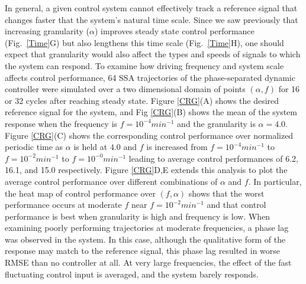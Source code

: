 \documentclass[12pt]{iopart}
\begin{document}
In general, a given control system cannot effectively track a reference signal that changes faster that the system's natural time scale. Since we saw previously that increasing granularity ($\alpha$) improves steady state control performance (Fig.\ \ref{Time}G) but also lengthens this time scale (Fig.\ \ref{Time}H), one should expect that granularity would also affect the types and speeds of signals to which the system can respond.
To examine how driving frequency and system scale affects control performance, 64 SSA trajectories of the phase-separated dynamic controller were simulated over a two dimensional domain of points $(\alpha,f)$ for 16 or 32 cycles after reaching steady state. Figure \ref{CRG}(A) shows the desired reference signal for the system, and Fig \ref{CRG}(B) shows the mean of the system response when the frequency is $f=10^{-4} min^{-1}$  and the granularity is $\alpha = 4.0$.  Figure \ref{CRG}(C) shows the corresponding control performance over normalized periodic time as $\alpha$ is held at $4.0$ and $f$ is increased from $f=10^{-4}min^{-1}$ \brian[Units]  to $f=10^{-2}min^{-1}$ \brian[Units]  to $f=10^{-0}min^{-1}$ \brian[Units]  leading to average control performances of 6.2, 16.1, and 15.0 respectively. 
Figure \ref{CRG}D,E extends this analysis to plot the average control performance over different combinations of $\alpha$ and $f$. 
In particular, the heat map of control performance over $(f,\alpha)$ shows that the worst performance occurs at moderate $f$ near $f=10^{-2}min^{-1}$ and that control performance is best when granularity is high and frequency is low.
 When examining poorly performing trajectories at moderate frequencies, a phase lag was observed in the system. In this case, although the qualitative form of the response may match to the reference signal, this phase lag resulted in worse RMSE than no controller at all.  At very large frequencies, the effect of the fast fluctuating control input is averaged, and the system barely responds. 
\end{document}
